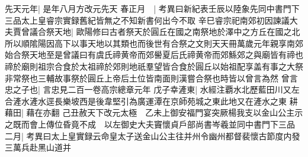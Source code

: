 先天元年|{
	是年八月方改元先天}
春正月　|{
	考異曰新紀表壬辰以陸象先同中書門下三品太上皇睿宗實録舊紀皆無之不知新書何出今不取}
辛巳睿宗祀南郊初因諫議大夫賈曾議合祭天地|{
	歐陽修曰古者祭天於圓丘在國之南祭地於澤中之方丘在國之北所以順隂陽因高下以事天地以其類也而後世有合祭之文則天天冊萬歲元年親享南郊始合祭天地至是曾議曰有虞氏禘黄帝而郊嚳夏后氏禘黄帝而郊鯀郊之與廟皆有禘也禘於廟則祖宗合食於太祖禘於郊則地祇羣望皆合食於圓丘以始祖配享盖有事之大祭非常祭也三輔故事祭於圓丘上帝后土位皆南面則漢嘗合祭也時皆以曾言為然}
曾言忠之子也|{
	言忠見二百一卷高宗總章元年}
戊子幸滻東|{
	水經注覇水北歷藍田川又左合滻水滻水逕長樂坡西是後韋堅引為廣運潭在京師苑城之東此地又在滻水之東}
耕藉田|{
	藉在亦翻}
己丑赦天下改元太極　乙未上御安福門宴突厥楊我支以金山公主示之既而會上傳位昏竟不成　以左御史大夫竇懷貞戶部尚書岑羲並同中書門下三品　二月|{
	考異曰太上皇實録云命皇太子送金山公主往并州令幽州都督裴懷古節度内發三萬兵赴黑山道并}


